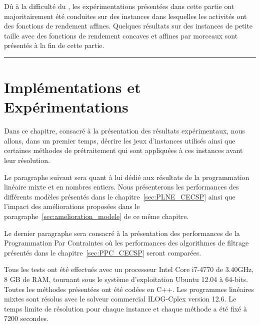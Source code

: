 \begin{center}
\begin{minipage}{\textwidth}
{    Dû à la difficulté du \CECSP, les expérimentations présentées
    dans cette partie ont majoritairement été conduites sur des
    instances dans lesquelles les activités ont des fonctions de
    rendement affines. Quelques résultats sur des instances de petite
    taille avec des fonctions de rendement concaves et affines par
    morceaux sont présentés à la fin de cette partie.}
    \vspace{0.5cm}
    \hrule
  \end{minipage}
\end{center}

\chapter{Implémentations et Expérimentations}

Dans ce chapitre, consacré à la présentation des résultats
expérimentaux, nous allons, dans un premier temps, décrire les
jeux d'instances utilisés ainsi que certaines méthodes de
prétraitement qui sont appliquées à ces instances avant leur
résolution. 

Le paragraphe suivant sera quant à lui dédié aux résultats de la
programmation linéaire mixte et en nombres entiers. Nous présenterons
les performances des différents modèles présentés dans le
chapitre~\ref{sec:PLNE_CECSP} ainsi que l'impact des améliorations
proposées dans le paragraphe~\ref{sec:amelioration_modele} de ce même
chapitre. 

Le dernier paragraphe sera consacré à la présentation des performances
de la Programmation Par Contraintes où les performances des
algorithmes de filtrage présentés dans le chapitre~\ref{sec:PPC_CECSP}
seront comparées. 

Tous les tests ont été effectués avec un processeur Intel Core i7-4770
de 3.40GHz, 8 GB de RAM, tournant sous le système d’exploitation
Ubuntu 12.04 à 64-bits. Toutes les méthodes présentées ont été codées
en C++. Les programmes linéaires mixtes sont résolus avec le solveur
commercial ILOG-Cplex version 12.6. Le temps limite de résolution pour
chaque instance et chaque méthode a été fixé à 7200 secondes.











